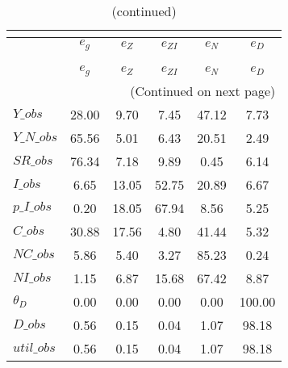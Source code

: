 
\begin{center}
\begin{longtable}{lccccc} 
\caption{VARIANCE DECOMPOSITION (in percent)}\\
 \label{Table:th_var_decomp_uncond}\\
\toprule 
$            $	 & 	 $       {e_g}$	 & 	 $       {e_Z}$	 & 	 $    {e_{ZI}}$	 & 	 $       {e_N}$	 & 	 $       {e_D}$\\
\midrule \endfirsthead 
\caption{(continued)}\\
 \toprule \\ 
$            $	 & 	 $       {e_g}$	 & 	 $       {e_Z}$	 & 	 $    {e_{ZI}}$	 & 	 $       {e_N}$	 & 	 $       {e_D}$\\
\midrule \endhead 
\midrule \multicolumn{6}{r}{(Continued on next page)} \\ \bottomrule \endfoot 
\bottomrule \endlastfoot 
$Y\_obs      $	 & 	       28.00	 & 	        9.70	 & 	        7.45	 & 	       47.12	 & 	        7.73 \\ 
$Y\_N\_obs   $	 & 	       65.56	 & 	        5.01	 & 	        6.43	 & 	       20.51	 & 	        2.49 \\ 
$SR\_obs     $	 & 	       76.34	 & 	        7.18	 & 	        9.89	 & 	        0.45	 & 	        6.14 \\ 
$I\_obs      $	 & 	        6.65	 & 	       13.05	 & 	       52.75	 & 	       20.89	 & 	        6.67 \\ 
$p\_I\_obs   $	 & 	        0.20	 & 	       18.05	 & 	       67.94	 & 	        8.56	 & 	        5.25 \\ 
$C\_obs      $	 & 	       30.88	 & 	       17.56	 & 	        4.80	 & 	       41.44	 & 	        5.32 \\ 
$NC\_obs     $	 & 	        5.86	 & 	        5.40	 & 	        3.27	 & 	       85.23	 & 	        0.24 \\ 
$NI\_obs     $	 & 	        1.15	 & 	        6.87	 & 	       15.68	 & 	       67.42	 & 	        8.87 \\ 
${\theta_D}  $	 & 	        0.00	 & 	        0.00	 & 	        0.00	 & 	        0.00	 & 	      100.00 \\ 
$D\_obs      $	 & 	        0.56	 & 	        0.15	 & 	        0.04	 & 	        1.07	 & 	       98.18 \\ 
$util\_obs   $	 & 	        0.56	 & 	        0.15	 & 	        0.04	 & 	        1.07	 & 	       98.18 \\ 
\end{longtable}
 \end{center}
